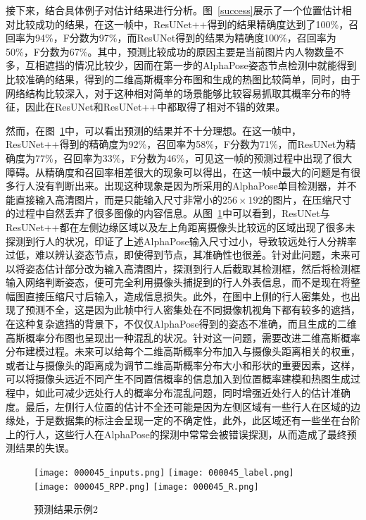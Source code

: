 接下来，结合具体例子对估计结果进行分析。图~\ref{success}展示了一个位置估计相对比较成功的结果，在这一帧中，ResUNet++得到的结果精确度达到了100\%，召回率为94\%，F分数为97\%，而ResUNet得到的结果为精确度100\%，召回率为50\%，F分数为67\%。其中，预测比较成功的原因主要是当前图片内人物数量不多，互相遮挡的情况比较少，因而在第一步的AlphaPose姿态节点检测中就能得到比较准确的结果，得到的二维高斯概率分布图和生成的热图比较简单，同时，由于网络结构比较深入，对于这种相对简单的场景能够比较容易抓取其概率分布的特征，因此在ResUNet和ResUNet++中都取得了相对不错的效果。


然而，在图~\ref{failure1}中，可以看出预测的结果并不十分理想。在这一帧中，ResUNet++得到的精确度为92\%，召回率为58\%，F分数为71\%，而ResUNet为精确度为77\%，召回率为33\%，F分数为46\%，可见这一帧的预测过程中出现了很大障碍。从精确度和召回率相差很大的现象可以得出，在这一帧中最大的问题是有很多行人没有判断出来。出现这种现象是因为所采用的AlphaPose单目检测器，并不能直接输入高清图片，而是只能输入尺寸非常小的$256\times 192$的图片，在压缩尺寸的过程中自然丢弃了很多图像的内容信息。从图~\ref{failure1}中可以看到，ResUNet与ResUNet++都在左侧边缘区域以及左上角距离摄像头比较远的区域出现了很多未探测到行人的状况，印证了上述AlphaPose输入尺寸过小，导致较远处行人分辨率过低，难以辨认姿态节点，即使得到节点，其准确性也很差。针对此问题，未来可以将姿态估计部分改为输入高清图片，探测到行人后截取其检测框，然后将检测框输入网络判断姿态，便可完全利用摄像头捕捉到的行人外表信息，而不是现在将整幅图直接压缩尺寸后输入，造成信息损失。此外，在图中上侧的行人密集处，也出现了预测不全，这是因为此帧中行人密集处在不同摄像机视角下都有较多的遮挡，在这种复杂遮挡的背景下，不仅仅AlphaPose得到的姿态不准确，而且生成的二维高斯概率分布图也呈现出一种混乱的状况。针对这一问题，需要改进二维高斯概率分布建模过程。未来可以给每个二维高斯概率分布加入与摄像头距离相关的权重，或者让与摄像头的距离成为调节二维高斯概率分布大小和形状的重要因素，这样，可以将摄像头远近不同产生不同置信概率的信息加入到位置概率建模和热图生成过程中，如此可减少远处行人的概率分布混乱问题，同时增强近处行人的估计准确度。最后，左侧行人位置的估计不全还可能是因为左侧区域有一些行人在区域的边缘处，于是数据集的标注会呈现一定的不确定性，此外，此区域还有一些坐在台阶上的行人，这些行人在AlphaPose的探测中常常会被错误探测，从而造成了最终预测结果的失误。
\begin{figure}
    \centering
      {\texttt{[image: 000045\_inputs.png]}}
      {\texttt{[image: 000045\_label.png]}}
      {\texttt{[image: 000045\_RPP.png]}}
      {\texttt{[image: 000045\_R.png]}}
    \caption{预测结果示例2}
    \label{failure1}
\end{figure}

